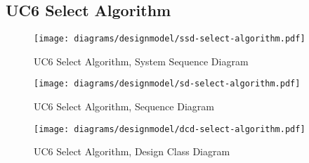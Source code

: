 \subsection{UC6 Select Algorithm}
\begin{figure}[H]
    \centering
    \texttt{[image: diagrams/designmodel/ssd-select-algorithm.pdf]}
    \caption{UC6 Select Algorithm, System Sequence Diagram}
    \label{fig:select-algorithm-ssd}
\end{figure}
\begin{figure}[H]
    \centering
    \texttt{[image: diagrams/designmodel/sd-select-algorithm.pdf]}
    \caption{UC6 Select Algorithm, Sequence Diagram}
    \label{fig:select-algorithm-sd}
\end{figure}
\begin{figure}[H]
    \centering
    \texttt{[image: diagrams/designmodel/dcd-select-algorithm.pdf]}
    \caption{UC6 Select Algorithm, Design Class Diagram}
    \label{fig:select-algorithm-dcd}
\end{figure}